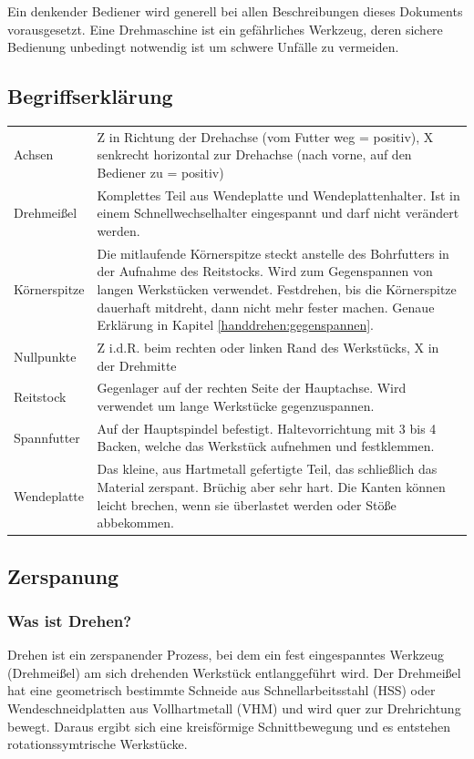 \documentclass{\basedir/fablab-document}
\begin{document}
Ein denkender Bediener wird generell bei allen Beschreibungen dieses Dokuments vorausgesetzt. Eine Drehmaschine ist ein gefährliches Werkzeug, deren sichere Bedienung unbedingt notwendig ist um schwere Unfälle zu vermeiden.

\subsection{Begriffserklärung}
\begin{tabular}{p{} p{}}
Achsen 				& Z in Richtung der Drehachse (vom Futter weg = positiv), X senkrecht horizontal zur Drehachse (nach vorne, auf den Bediener zu = positiv) \\
Drehmeißel 		& Komplettes Teil aus Wendeplatte und Wendeplattenhalter. Ist in einem Schnell\-wechsel\-halter eingespannt und darf nicht verändert werden. \\
Körnerspitze 	& Die mitlaufende Körnerspitze steckt anstelle des Bohrfutters in der Aufnahme des Reitstocks. Wird zum Gegenspannen von langen Werkstücken verwendet. Festdrehen, bis die Körnerspitze dauerhaft mitdreht, dann nicht mehr fester machen. Genaue Erklärung in Kapitel \ref{handdrehen:gegenspannen}. \\
Nullpunkte 		& Z i.d.R. beim rechten oder linken Rand des Werkstücks, X in der Drehmitte \\
Reitstock 		& Gegenlager auf der rechten Seite der Hauptachse. Wird verwendet um lange Werkstücke gegenzuspannen. \\
Spannfutter 	& Auf der Hauptspindel befestigt. Haltevorrichtung mit 3 bis 4 Backen, welche das Werkstück aufnehmen und festklemmen. \\
Wendeplatte 	& Das kleine, aus Hartmetall gefertigte Teil, das schließlich das Material zerspant. Brüchig aber sehr hart. Die Kanten können leicht brechen, wenn sie überlastet werden oder Stöße abbekommen. \\
\end{tabular}

\subsection{Zerspanung}
\subsubsection{Was ist Drehen?}
Drehen ist ein zerspanender Prozess, bei dem ein fest eingespanntes Werkzeug (Drehmeißel) am sich drehenden Werkstück entlanggeführt wird.
Der Drehmeißel hat eine geometrisch bestimmte Schneide aus Schnellarbeitsstahl (HSS) oder Wendeschneidplatten aus Vollhartmetall (VHM) und wird quer zur Drehrichtung bewegt.
Daraus ergibt sich eine kreisförmige Schnittbewegung und es entstehen rotationssymtrische Werkstücke.
\end{document}
